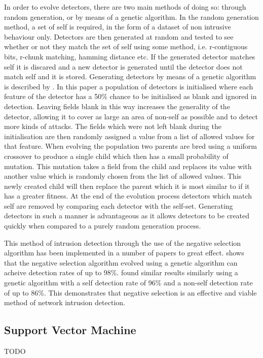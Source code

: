	In order to evolve detectors, there are two main methods of doing so: through random generation, or by means of a genetic algorithm. In the random generation method, a set of self is required, in the form of a dataset of non intrusive behaviour only. Detectors are then generated at random and tested to see whether or not they match the set of self using some method, i.e. r-contiguous bits, r-chunk matching, hamming distance etc. If the generated detector matches self it is discared and a new detector is generated until the detector does not match self and it is stored. Generating detectors by means of a genetic algorithm is described by \cite{powers2008hybrid}. In this paper a population of detectors is initialised where each feature of the detector has a 50\% chance to be initialised as blank and ignored in detection. Leaving fields blank in this way increases the generality of the detector, allowing it to cover as large an area of non-self as possible and to detect more kinds of attacks. The fields which were not left blank during the initialisation are then randomly assigned a value from a list of allowed values for that feature. When evolving the population two parents are bred using a uniform crossover to produce a single child which then has a small probability of mutation. This mutation takes a field from the child and replaces its value with another value which is randomly chosen from the list of allowed values. This newly created child will then replace the parent which it is most similar to if it has a greater fitness. At the end of the evolution process detectors which match self are removed by comparing each detector with the self-set. Generating detectors in such a manner is advantageous as it allows detectors to be created quickly when compared to a purely random generation process.
	
	This method of intrusion detection through the use of the negative selection algorithm has been implemented in a number of papers to great effect. \cite{powers2008hybrid} shows that the negative selection algorithm evolved using a genetic algorithm can acheive detection rates of up to 98\%. \cite{dasgupta2002immunity} found similar results similarly using a genetic algorithm with a self detection rate of 96\% and a non-self detection rate of up to 86\%. This demonstrates that negative selection is an effective and viable method of network intrusion detection.
	
\subsection{Support Vector Machine}
TODO

